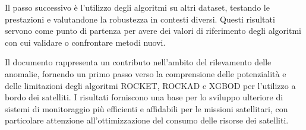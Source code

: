Il passo successivo è l'utilizzo degli algoritmi su altri dataset, testando le prestazioni e valutandone la robustezza in contesti diversi.
Questi risultati servono come punto di partenza per avere dei valori di riferimento degli algoritmi con cui validare o confrontare metodi nuovi.

Il documento rappresenta un contributo nell'ambito del rilevamento delle anomalie, fornendo un primo passo verso la comprensione delle potenzialità e delle limitazioni degli algoritmi ROCKET, ROCKAD e XGBOD per l'utilizzo a bordo dei satelliti.
I risultati forniscono una base per lo sviluppo ulteriore di sistemi di monitoraggio più efficienti e affidabili per le missioni satellitari, con particolare attenzione all'ottimizzazione del consumo delle risorse dei satelliti.